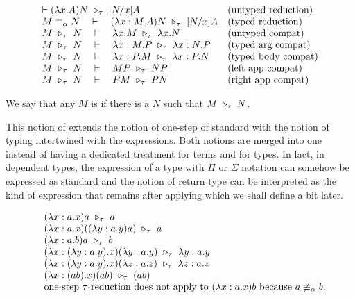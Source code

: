 \begin{definition}[\osteptaureduction $\stotau$]
\[
\begin{array}{ll}
    \vdash (\lambda x.A)N \ \triangleright_{\tau}\  [N/x]A & \text{(untyped reduction)} \\
    M \equiv_\alpha N \quad \vdash \quad (\lambda x:M.A)N \ \triangleright_{\tau}\  [N/x]A & \text{(typed reduction)} \\
    M \ \triangleright_{\tau}\  N \quad \vdash \quad \lambda x.M \ \triangleright_{\tau}\  \lambda x.N & \text{(untyped compat}) \\
    M \ \triangleright_{\tau}\  N \quad \vdash \quad \lambda x:M.P \ \triangleright_{\tau}\  \lambda x:N.P & \text{(typed arg compat}) \\
    M \ \triangleright_{\tau}\  N \quad \vdash \quad \lambda x:P.M \ \triangleright_{\tau}\  \lambda x:P.N & \text{(typed body compat)} \\
    M \ \triangleright_{\tau}\  N \quad \vdash \quad MP \ \triangleright_{\tau}\  NP & \text{(left app compat)} \\
    M \ \triangleright_{\tau}\  N \quad \vdash \quad PM \ \triangleright_{\tau}\  PN & \text{(right app compat)}\\
\end{array}
\]
\end{definition}

\begin{definition} We say that any $M$ is \osteptaureducible if there is a $N$ such that $M \ \triangleright_{\tau}\  N$.
\end{definition}

This notion of \osteptaureduction extends the notion of one-step \betareduction of standard \lcalc with the notion of typing intertwined with the expressions. Both notions are merged into one instead of having a dedicated treatment for terms and for types. In fact, in dependent types, the expression of a type with $\Pi$ or $\Sigma$ notation can somehow be expressed as standard \lterms and the notion of return type can be interpreted as the kind of expression that remains after applying \msteptaureduction which we shall define a bit later.

\begin{examples}
\[
\begin{array}{ll}
    & (\lambda x:a.x) a \stotau a \\
    & (\lambda x:a.x) ((\lambda y:a.y) a) \stotau a \\
    & (\lambda x:a.b) a \stotau b \\
    & (\lambda x:(\lambda y:a.y).x) (\lambda y:a.y) \stotau \lambda y:a.y \\
    & (\lambda x:(\lambda y:a.y).x) (\lambda z:a.z) \stotau \lambda z:a.z \\
    & (\lambda x:(a b).x) (a b) \stotau (a b) \\
    & \text{\osteptaureduction does not apply to $(\lambda x:a.x) b$ because $a \not\alphaeq b$.} \\
\end{array}
\]
\end{examples}

